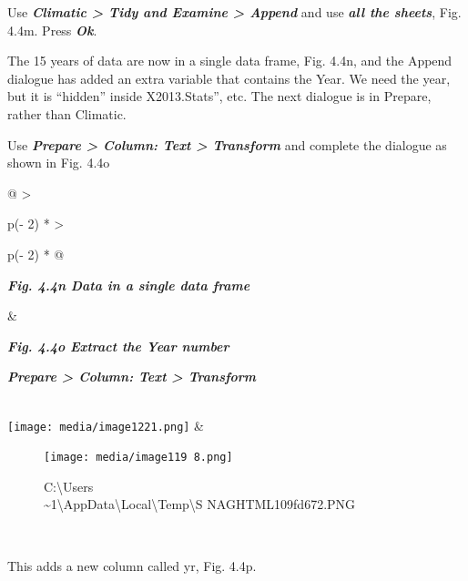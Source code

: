 \documentclass[
  letterpaper,
  DIV=11,
  numbers=noendperiod]{scrreprt}
\begin{document}
Use \textbf{\emph{Climatic \textgreater{} Tidy and Examine
\textgreater{} Append}} and use \textbf{\emph{all the sheets}}, Fig.
4.4m. Press \textbf{\emph{Ok}}.

The 15 years of data are now in a single data frame, Fig. 4.4n, and the
Append dialogue has added an extra variable that contains the Year. We
need the year, but it is ``hidden'' inside X2013.Stats'', etc. The next
dialogue is in Prepare, rather than Climatic.

Use \textbf{\emph{Prepare \textgreater{} Column: Text \textgreater{}
Transform}} and complete the dialogue as shown in Fig. 4.4o

\begin{longtable}[]{@{}
  >{\raggedright\arraybackslash}p{(\columnwidth - 2\tabcolsep) * }
  >{\raggedright\arraybackslash}p{(\columnwidth - 2\tabcolsep) * }@{}}
\toprule\noalign{}
\begin{minipage}[b]{\linewidth}\raggedright
\textbf{\emph{Fig. 4.4n Data in a single data frame}}
\end{minipage} & \begin{minipage}[b]{\linewidth}\raggedright
\textbf{\emph{Fig. 4.4o Extract the Year number}}

\textbf{\emph{Prepare \textgreater{} Column: Text \textgreater{}
Transform}}
\end{minipage} \\
\midrule\noalign{}
\endhead
\bottomrule\noalign{}
\endlastfoot
\texttt{[image: media/image1221.png]}
& \begin{minipage}[t]{\linewidth}\raggedright
\begin{figure}[H]

{\centering \texttt{[image: media/image119 8.png]}

}

\caption{C:\textbackslash Users\\
\ROGERS\textasciitilde1\textbackslash AppData\textbackslash Local\textbackslash Temp\textbackslash S
NAGHTML109fd672.PNG}

\end{figure}%
\end{minipage} \\
\end{longtable}

This adds a new column called yr, Fig. 4.4p.
\end{document}
